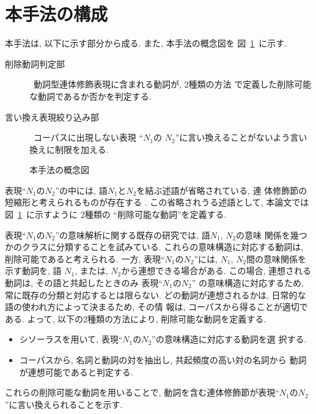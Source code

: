 \section{本手法の構成}\label{kousei}
本手法は, 以下に示す部分から成る. また, 本手法の概念図を
図~\ref{gainen}~に示す. 
\begin{description}
 \item[削除動詞判定部] \ 動詞型連体修飾表現に含まれる動詞が, 2種類の方法
	    で定義した削除可能な動詞であるか否かを判定する.
	    
 \item[言い換え表現絞り込み部] \ コーパスに出現しない表現 ``$N_1$の
	    $N_2$''に言い換えることがないよう言い換えに制限を加える.
\end{description}

\begin{figure}
\begin{center}
\caption{本手法の概念図}
\label{gainen}
\end{center}
\end{figure}

表現``$N_1のN_2$''の中には, 語$N_1$と$N_2$を結ぶ述語が省略されている, 連
体修飾節の短縮形と考えられるものが存在する
\cite{hirai86,kurohashi99,shimadu85}.
この省略されうる述語として, 本論文では図~\ref{gainen}~に示すように
 2種類の ``削除可能な動詞''を定義する\cite{kataoka99nlprs}.

表現``$N_1のN_2$''の意味解析に関する既存の研究では, 語$N_1$, $N_2$の意味 
関係を幾つかのクラスに分類することを試みている\cite{hirai86,kokugo51}.
これらの意味構造に対応する動詞は, 削除可能であると考えられる.
一方, 表現``$N_1のN_2$''には, $N_1$, $N_2$間の意味関係を示す動詞を, 語
$N_1$, または, $N_2$から連想できる場合がある.
この場合, 連想される動詞は, その語と共起したときのみ 表現``$N_1のN_2$''
の意味構造に対応するため, 常に既存の分類と対応するとは限らない.
どの動詞が連想されるかは, 日常的な語の使われ方によって決まるため, その情
報は, コーパスから得ることが適切である.
よって, 以下の2種類の方法により, 削除可能な動詞を定義する.
\begin{itemize}
 \item シソーラスを用いて, 表現``$N_1のN_2$''の意味構造に対応する動詞を選
       択する.
 \item コーパスから, 名詞と動詞の対を抽出し, 共起頻度の高い対の名詞から
       動詞が連想可能であると判定する.
\end{itemize}

これらの削除可能な動詞を用いることで, 動詞を含む連体修飾節が表現``$N_1の
N_2$''に言い換えられることを示す. 

